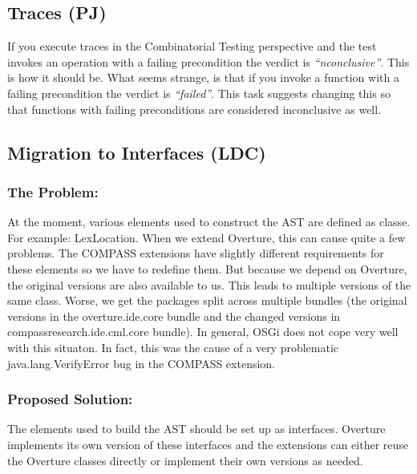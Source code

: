 \documentclass[11pt]{report}
\begin{document}
\subsection*{Traces (PJ)}

If you execute traces in the Combinatorial Testing perspective and the test invokes an operation with a failing precondition the verdict is \textit{``nconclusive''}. This is how it should be. What seems strange, is that if you invoke a function with a failing precondition the verdict is \textit{``failed''}. This task suggests changing this so that functions with failing preconditions are considered inconclusive as well.


\subsection*{Migration to Interfaces (LDC)}
    \label{ssec:interfacemig}

    \subsubsection{The Problem:}

    At the moment, various elements used to construct the AST are defined as
    classe. For example: \textsf{LexLocation}. When we extend Overture, this can cause
    quite a few problems. The COMPASS extensions have slightly different
    requirements for these elements so we have to redefine them. But because we
    depend on Overture, the original versions are also available to us. This
    leads to multiple versions of the same class. Worse, we get the packages
    split across multiple bundles (the original versions in the
    overture.ide.core bundle and the changed versions in
    compassresearch.ide.cml.core bundle). In general, OSGi does not cope very
    well with this situaton. In fact, this was the cause of a very problematic
    \textsf{java.lang.VerifyError} bug in the COMPASS extension.




    \subsubsection{Proposed Solution:}
    
    The elements used to build the AST should be set up as interfaces. Overture
    implements its own version of these interfaces and the extensions can either 
    reuse the Overture classes directly or implement their own versions as needed.
\end{document}
